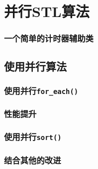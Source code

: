 \section{并行STL算法}\label{ch22}

\subsubsection*{一个简单的计时器辅助类}

\subsection{使用并行算法}

\subsubsection{使用并行\texttt{for\_each()}}

\subsubsection*{性能提升}

\subsubsection{使用并行\texttt{sort()}}

\subsubsection*{结合其他的改进}\label{ch22.1.2.1}